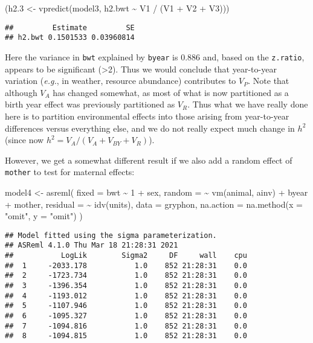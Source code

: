 \documentclass[
  12pt,
]{book}
\newenvironment{Shaded}{\begin{snugshade}}{\end{snugshade}}
\newcommand{\AttributeTok}[1]{\textcolor[rgb]{0.77,0.63,0.00}{#1}}
\newcommand{\DecValTok}[1]{\textcolor[rgb]{0.00,0.00,0.81}{#1}}
\newcommand{\FloatTok}[1]{\textcolor[rgb]{0.00,0.00,0.81}{#1}}
\newcommand{\FunctionTok}[1]{\textcolor[rgb]{0.00,0.00,0.00}{#1}}
\newcommand{\NormalTok}[1]{#1}
\newcommand{\OtherTok}[1]{\textcolor[rgb]{0.56,0.35,0.01}{#1}}
\newcommand{\SpecialCharTok}[1]{\textcolor[rgb]{0.00,0.00,0.00}{#1}}
\newcommand{\StringTok}[1]{\textcolor[rgb]{0.31,0.60,0.02}{#1}}
\begin{document}
\begin{Shaded}
\begin{Highlighting}[]
\NormalTok{(h2}\FloatTok{.3} \OtherTok{\textless{}{-}} \FunctionTok{vpredict}\NormalTok{(model3, h2.bwt }\SpecialCharTok{\textasciitilde{}}\NormalTok{ V1 }\SpecialCharTok{/}\NormalTok{ (V1 }\SpecialCharTok{+}\NormalTok{ V2 }\SpecialCharTok{+}\NormalTok{ V3)))}
\end{Highlighting}
\end{Shaded}

\begin{verbatim}
##         Estimate         SE
## h2.bwt 0.1501533 0.03960814
\end{verbatim}

Here the variance in \texttt{bwt} explained by \texttt{byear} is 0.886 and, based on the \texttt{z.ratio}, appears to be significant (\textgreater2). Thus we would conclude that year-to-year variation (\emph{e.g.}, in weather, resource abundance) contributes to \(V_P\). Note that although \(V_A\) has changed somewhat, as most of what is now partitioned as a birth year effect was previously partitioned as \(V_R\). Thus what we have really done here is to partition environmental effects into those arising from year-to-year differences versus everything else, and we do not really expect much change in \(h^2\) (since now \(h^2 = V_A/ (V_A+V_{BY}+V_R)\)).

However, we get a somewhat different result if we also add a random effect of \texttt{mother} to test for maternal effects:

\begin{Shaded}
\begin{Highlighting}[]
\NormalTok{model4 }\OtherTok{\textless{}{-}} \FunctionTok{asreml}\NormalTok{(}
  \AttributeTok{fixed =}\NormalTok{ bwt }\SpecialCharTok{\textasciitilde{}} \DecValTok{1} \SpecialCharTok{+}\NormalTok{ sex,}
  \AttributeTok{random =} \SpecialCharTok{\textasciitilde{}} \FunctionTok{vm}\NormalTok{(animal, ainv) }\SpecialCharTok{+}\NormalTok{ byear }\SpecialCharTok{+}\NormalTok{ mother,}
  \AttributeTok{residual =} \SpecialCharTok{\textasciitilde{}} \FunctionTok{idv}\NormalTok{(units),}
  \AttributeTok{data =}\NormalTok{ gryphon,}
  \AttributeTok{na.action =} \FunctionTok{na.method}\NormalTok{(}\AttributeTok{x =} \StringTok{"omit"}\NormalTok{, }\AttributeTok{y =} \StringTok{"omit"}\NormalTok{)}
\NormalTok{)}
\end{Highlighting}
\end{Shaded}

\begin{verbatim}
## Model fitted using the sigma parameterization.
## ASReml 4.1.0 Thu Mar 18 21:28:31 2021
##           LogLik        Sigma2     DF     wall    cpu
##  1     -2033.178           1.0    852 21:28:31    0.0
##  2     -1723.734           1.0    852 21:28:31    0.0
##  3     -1396.354           1.0    852 21:28:31    0.0
##  4     -1193.012           1.0    852 21:28:31    0.0
##  5     -1107.946           1.0    852 21:28:31    0.0
##  6     -1095.327           1.0    852 21:28:31    0.0
##  7     -1094.816           1.0    852 21:28:31    0.0
##  8     -1094.815           1.0    852 21:28:31    0.0
\end{verbatim}
\end{document}
